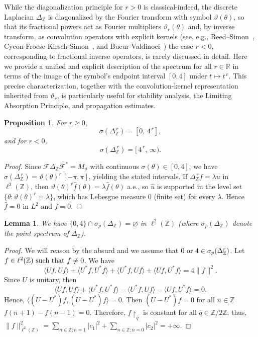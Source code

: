 \documentclass[10pt]{amsart} %
\newcommand{\Z}{{\mathbb{Z}}}
\newcommand{\1}{{\mathbb{I}}}
\numberwithin{equation}{section}
\newtheorem{proposition}[theorem]{Proposition}%
\newtheorem{lemma}[theorem]{Lemma}%
\begin{document}
\noindent
While the diagonalization principle for $r>0$ is classical-indeed, the discrete Laplacian $\Delta_{\mathbb{Z}}$ is diagonalized by the Fourier transform with symbol $\vartheta(\theta)$, so that its fractional powers act as Fourier multipliers $\vartheta_r(\theta)$ and, by inverse transform, as convolution operators with explicit kernels (see, e.g., Reed--Simon~\cite[Chapter XIII.13]{RS}, Cycon-Froese-Kirsch-Simon~\cite[Chapter 5]{cl}, and Bucur-Valdinoci~\cite[Section 3]{BuVa}) the case $r<0$, corresponding to fractional inverse operators, is rarely discussed in detail. Here we provide a unified and explicit description of the spectrum for all $r\in\mathbb{R}$ in terms of the image of the symbol's endpoint interval $[0,4]$ under $t\mapsto t^{\,r}$. This precise characterization, together with the convolution-kernel representation inherited from $\vartheta_r$,
 is particularly useful for stability analysis, the Limiting Absorption Principle, and propagation estimates.

\begin{proposition}\label{prop:spec-all-r}
For $r\ge 0$,
\[
\sigma(\Delta_{\Z}^{\,r})=[0,\,4^{\,r}],
\]
and for $r<0$,
\[
\sigma(\Delta_{\Z}^{\,r})=[\,4^{\,r},\,\infty).
\]

\end{proposition}

\begin{proof}
Since $\mathcal F\Delta_{\Z}\mathcal F^*=M_{\vartheta}$ with continuous
$\sigma(\theta)\in[0,4]$, we have
$\sigma(\Delta_{\Z}^{\,r})=\overline{\vartheta(\theta)^r\,[ -\pi,\pi]}$,
yielding the stated intervals. If $\Delta_{\Z}^{\,r}f=\lambda u$ in $\ell^2(\Z)$, then
$\vartheta(\theta)^r\widehat f(\theta)=\lambda \widehat f(\theta)$ a.e.,
so $\widehat u$ is supported in the level set $\{\theta:\vartheta(\theta)^r=\lambda\}$,
which has Lebesgue measure $0$ (finite set) for every $\lambda$.
Hence $\widehat f=0$ in $L^2$ and $f=0$.
\end{proof}

\begin{lemma}\label{marwa}
We have $\{0,4\}\cap\sigma_p(\Delta_{\Z})=\varnothing$ in $\ell^{2}(\Z)$ (where $\sigma_p(\Delta_{\Z})$ denote the point spectrum of $\Delta_{\Z}$).

\end{lemma}



\begin{proof}
We will reason by the absurd and we assume that $0 \hbox{ or } 4\in\sigma_{p}(\Delta^r_{\Z})$.
Let $f\in\ell^2(\Z) \hbox{ such that } f\neq0$. We have
 \[\langle Uf,Uf\rangle+\langle U^*f,U^*f\rangle+\langle U^*f,Uf\rangle+\langle Uf,U^*f\rangle=4\|f\|^2.\]
Since $U$ is unitary, then
\[\langle Uf,Uf\rangle+\langle U^*f,U^*f\rangle-\langle U^*f,Uf\rangle-\langle Uf,U^*f\rangle=0.\]
Hence, $\langle(U-U^*)f,(U-U^*)f\rangle=0$. Then $(U-U^*)f=0$ for all $n\in\Z$ $f(n+1)-f(n-1)=0$.
Therefore, $f\!\restriction_{\overline{q}}$ is constant for all $\overline{q}\in\Z/2\Z$.
thus, $\|f\|^2_{\ell^2(\Z)}=\sum_{n\in\Z; \overline{n}=1}|c_1|^2+\sum_{n\in\Z;\overline{ n}=0}|c_2|^2=+\infty$.
\end{proof}
\end{document}
